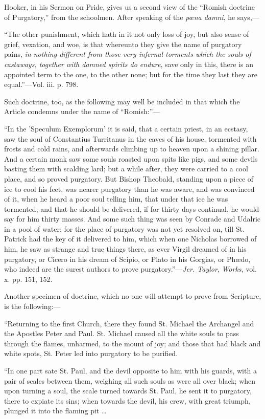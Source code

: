 Hooker, in his Sermon on Pride, gives us a second view of the
``Romish doctrine of Purgatory,'' from the schoolmen. After
speaking of the \emph{pœna damni}, he says,—

``The other punishment, which hath in it not
only loss of joy, but also sense of grief, vexation, and woe, is that
whereunto they give the name of purgatory pains, \emph{in nothing
different from those very infernal torments which the souls of
castaways, together with damned spirits do endure}, save only in
this, there is an appointed term to the one, to the other none; but
for the time they last they are equal.''—Vol. iii. p. 798.

Such doctrine, too, as the following may well be included in that
which the Article condemns under the name of ``Romish:''—

``In the 'Speculum Exemplorum' it is said, that
a certain priest, in an ecstasy, saw the soul of Constantius
Turritanus in the eaves of his house, tormented with frosts and cold
rains, and afterwards climbing up to heaven upon a shining pillar. And
a certain monk saw some souls roasted upon spits like pigs, and some
devils basting them with scalding lard; but a while after, they were
carried to a cool place, and so proved purgatory. But Bishop Theobald,
standing upon a piece of ice to cool his feet, was nearer purgatory
than he was aware, and was convinced of it, when he heard a poor soul
telling him, that under that ice he was tormented; and that he should
be delivered, if for thirty days continual, he would say for him
thirty masses. And some such thing was seen by Conrade and Udalric in
a pool of water; for the place of purgatory was not yet resolved on,
till St. Patrick had the key of it delivered to him, which when one
Nicholas borrowed of him, he saw as strange and true things there, as
ever Virgil dreamed of in his purgatory, or Cicero in his dream of
Scipio, or Plato in his Gorgias, or Phædo, who indeed are the surest
authors to prove purgatory.''—\emph{Jer. Taylor}, \emph{Works},
vol. x. pp. 151, 152.

Another specimen of doctrine, which no one will attempt to prove
from Scripture, is the following:—

``Returning to the first Church, there they
found St. Michael the Archangel and the Apostles Peter and Paul. St.
Michael caused all the white souls to pass through the flames,
unharmed, to the mount of joy; and those that had black and white
spots, St. Peter led into purgatory to be purified.

``In one part sate St. Paul, and the devil
opposite to him with his guards, with a pair of scales between them,
weighing all such souls as were all over black; when upon turning a
soul, the scale turned towards St. Paul, he sent it to purgatory,
there to expiate its sins; when towards the devil, his crew, with
great triumph, plunged it into the flaming pit …

